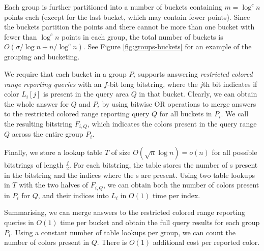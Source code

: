 Each group is further partitioned into a number of buckets containing $m = \log ^c n$ points each (except for the last bucket, which may contain fewer points). Since the buckets partition the points and there cannot be more than one bucket with fewer than $\log ^c n$ points in each group, the total number of buckets is $O(\sigma / \log n + n / \log ^c n)$. See Figure \ref{fig:groups-buckets} for an example of the grouping and bucketing. 

We require that each bucket in a group $P_i$ supports answering \emph{restricted colored range reporting queries} with an $f$-bit long bitstring, where the $j$th bit indicates if color $L_i[j]$ is present in the query area $Q$ in that bucket. Clearly, we can obtain the whole answer for $Q$ and $P_i$ by using bitwise OR operations to merge answers to the restricted colored range reporting query $Q$ for all buckets in $P_i$. We call the resulting bitstring $F_{i, Q}$, which indicates the colors present in the query range $Q$ across the entire group $P_i$.

Finally, we store a lookup table $T$ of size $O(\sqrt{n} \log n) = o(n)$ for all possible bitstrings of length $\frac{f}{2}$. For each bitstring, the table stores the number of {\bitone}s present in the bitstring and the indices where the {\bitone}s are present. Using two table lookups in $T$ with the two halves of $F_{i, Q}$, we can obtain both the number of colors present in $P_i$ for $Q$, and their indices into $L_i$ in $O(1)$ time per index. 

Summarising, we can merge answers to the restricted colored range reporting queries in $O(1)$ time per bucket and obtain the full query results for each group $P_i$. Using a constant number of table lookups per group, we can count the number of colors present in $Q$. There is $O(1)$ additional cost per reported color.

